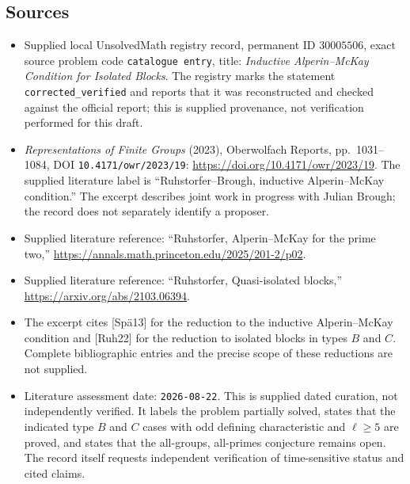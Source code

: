 \documentclass[11pt]{article}
\begin{document}
\subsection{Sources}
\begin{itemize}
\item Supplied local UnsolvedMath registry record, permanent ID \(30005506\), exact source problem code \texttt{catalogue entry}, title: \emph{Inductive Alperin--McKay Condition for Isolated Blocks}. The registry marks the statement \texttt{corrected\_verified} and reports that it was reconstructed and checked against the official report; this is supplied provenance, not verification performed for this draft.
\item \emph{Representations of Finite Groups} (2023), Oberwolfach Reports, pp.~1031--1084, DOI \texttt{10.4171/owr/2023/19}: \url{https://doi.org/10.4171/owr/2023/19}. The supplied literature label is ``Ruhstorfer--Brough, inductive Alperin--McKay condition.'' The excerpt describes joint work in progress with Julian Brough; the record does not separately identify a proposer.
\item Supplied literature reference: ``Ruhstorfer, Alperin--McKay for the prime two,'' \url{https://annals.math.princeton.edu/2025/201-2/p02}.
\item Supplied literature reference: ``Ruhstorfer, Quasi-isolated blocks,'' \url{https://arxiv.org/abs/2103.06394}.
\item The excerpt cites [Sp\"a13] for the reduction to the inductive Alperin--McKay condition and [Ruh22] for the reduction to isolated blocks in types \(B\) and \(C\). Complete bibliographic entries and the precise scope of these reductions are not supplied.
\item Literature assessment date: \texttt{2026-08-22}. This is supplied dated curation, not independently verified. It labels the problem partially solved, states that the indicated type \(B\) and \(C\) cases with odd defining characteristic and \(\ell\geq5\) are proved, and states that the all-groups, all-primes conjecture remains open. The record itself requests independent verification of time-sensitive status and cited claims.
\end{itemize}
\end{document}
